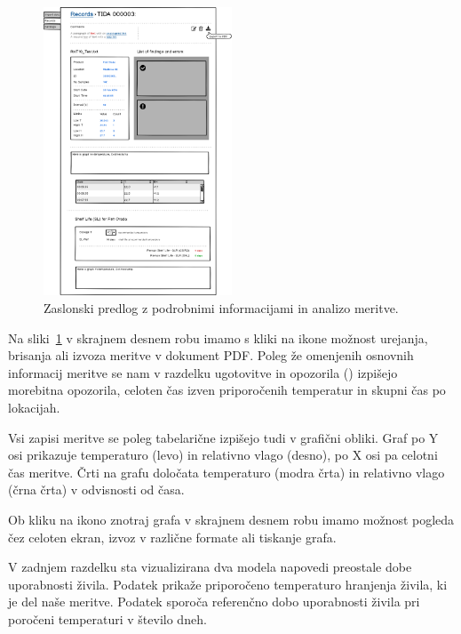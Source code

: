 \documentclass[a4paper, 12pt]{book}
\begin{document}
\begin{figure}[h]
\begin{center}
\includegraphics[width=0.5\textwidth]{slike/Record-view.png}
\end{center}
\caption{Zaslonski predlog z podrobnimi informacijami in analizo meritve.}
\label{record-wireframe}
\end{figure}

Na sliki~\ref{record-wireframe} v skrajnem desnem robu imamo s kliki na ikone možnost urejanja, brisanja ali izvoza meritve v dokument PDF.
Poleg že omenjenih osnovnih informacij meritve se nam v razdelku ugotovitve in opozorila () izpišejo morebitna opozorila, celoten čas izven priporočenih temperatur in skupni čas po lokacijah.

Vsi zapisi meritve se poleg tabelarične izpišejo tudi v grafični obliki.
Graf po Y osi prikazuje temperaturo (levo) in relativno vlago (desno), po X osi pa celotni čas meritve. Črti na grafu določata temperaturo (modra črta) in relativno vlago (črna črta) v odvisnosti od časa.

Ob kliku na ikono znotraj grafa v skrajnem desnem robu imamo možnost pogleda čez celoten ekran, izvoz v različne formate ali tiskanje grafa.

V zadnjem razdelku sta vizualizirana dva modela napovedi preostale dobe uporabnosti živila. Podatek  prikaže priporočeno temperaturo hranjenja živila, ki je del naše meritve. Podatek  sporoča referenčno dobo uporabnosti živila pri poročeni temperaturi v število dneh. 
\end{document}
